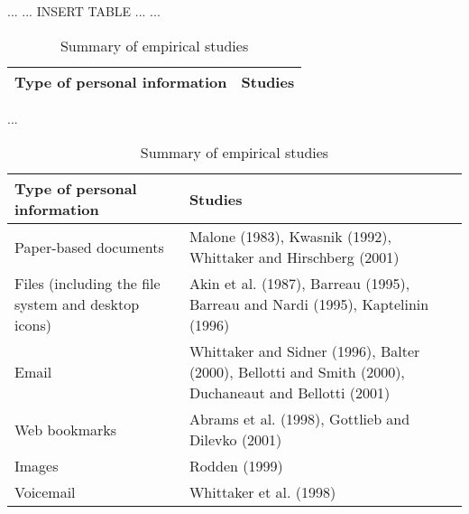 \begin{small}
\begin{table}
\begin{center}
...
... INSERT TABLE ...
...
\begin{tabular}{|p{4cm}|p{7cm}|}
\hline
\textbf{Type of personal information} &    \textbf{Studies} \\
\hline \hline
\end{tabular}  
...
\caption{Summary of empirical studies}
\label{table:empirical_studies_summary}
\end{center}
\end{table}
\end{small}

\begin{small}
\begin{table}
\begin{center}
\begin{tabular}{|p{4cm}|p{7cm}|}
\hline
\textbf{Type of personal information} &    \textbf{Studies} \\
\hline \hline
Paper-based documents & Malone (1983), Kwasnik (1992), Whittaker and Hirschberg (2001) \\
\hline
Files (including the file system and desktop icons) & Akin et al. (1987), Barreau (1995), Barreau and Nardi (1995), Kaptelinin (1996) \\
\hline
     Email & Whittaker and Sidner (1996), Balter (2000), Bellotti and Smith (2000), Duchaneaut and Bellotti (2001) \\
\hline
Web bookmarks & Abrams et al. (1998), Gottlieb and Dilevko (2001) \\
\hline
    Images & Rodden (1999) \\
\hline
 Voicemail & Whittaker et al. (1998) \\
\hline
\end{tabular}  
\caption{Summary of empirical studies}
\label{table:empirical_studies_summary}
\end{center}
\end{table}
\end{small}


